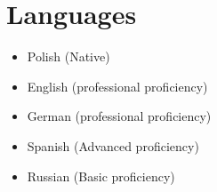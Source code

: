 \section{Languages}

\begin{paracol}{2}
\begin{itemize}
    \item Polish (Native)
    \item English (professional proficiency)
    \item German (professional proficiency)
\end{itemize}
\switchcolumn
\begin{itemize}
    \item Spanish (Advanced proficiency)
    \item Russian (Basic proficiency)
\end{itemize}
\end{paracol}
